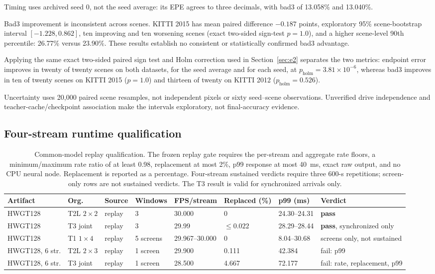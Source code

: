\documentclass[sigconf,review,anonymous]{acmart}
\begin{document}
Timing uses archived seed 0, not the seed average: its EPE agrees to three decimals, with bad3 of 13.058\% and 13.040\%.

Bad3 improvement is inconsistent across scenes. KITTI 2015 has mean paired difference $-0.187$ points, exploratory 95\% scene-bootstrap interval $[-1.228,0.862]$, ten improving and ten worsening scenes (exact two-sided sign-test $p=1.0$), and a higher scene-level 90th percentile: 26.77\% versus 23.90\%. These results establish no consistent or statistically confirmed bad3 advantage.

Applying the same exact two-sided paired sign test and Holm correction used in Section~\ref{sec:e2} separates the two metrics: endpoint error improves in twenty of twenty scenes on both datasets, for the seed average and for each seed, at $p_{\mathrm{holm}} = 3.81\times10^{-6}$, whereas bad3 improves in ten of twenty scenes on KITTI 2015 ($p = 1.0$) and thirteen of twenty on KITTI 2012 ($p_{\mathrm{holm}} = 0.526$).

Uncertainty uses 20,000 paired scene resamples, not independent pixels or sixty seed--scene observations. Unverified drive independence and teacher-cache/checkpoint association make the intervals exploratory, not final-accuracy evidence.

\subsection{Four-stream runtime qualification}
\label{sec:c4}
\begin{table}[t]
\centering
\footnotesize
\caption{Common-model replay qualification. The frozen replay gate requires the per-stream and aggregate rate floors, a minimum/maximum rate ratio of at least 0.98, replacement at most 2\%, p99 response at most 40~ms, exact raw output, and no CPU neural node. Replacement is reported as a percentage. Four-stream sustained verdicts require three 600-s repetitions; screen-only rows are not sustained verdicts. The T3 result is valid for synchronized arrivals only.}
\label{tab:common_sustained}
\begin{tabular}{llllllll}
\hline
Artifact & Org. & Source & Windows & FPS/stream & Replaced (\%) & p99 (ms) & Verdict\\
\hline
HWGT128 & T2L $2\times2$ & replay & 3 & 30.000 & 0 & 24.30--24.31 & \textbf{pass}\\
HWGT128 & T3 joint & replay & 3 & 29.99 & $\le 0.022$ & 28.29--28.44 & \textbf{pass}, synchronized only\\
HWGT128 & T1 $1\times4$ & replay & 5 screens & 29.967--30.000 & 0 & 8.04--30.68 & screens only, not sustained\\
HWGT128, 6 str. & T2L $2\times3$ & replay & 1 screen & 29.900 & 0.111 & 42.384 & fail: p99\\
HWGT128, 6 str. & T3 joint & replay & 1 screen & 28.500 & 4.667 & 72.177 & fail: rate, replacement, p99\\
\hline
\end{tabular}
\end{table}
\end{document}
